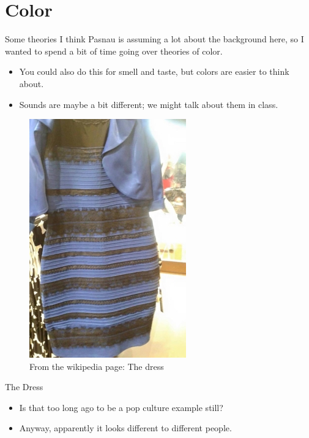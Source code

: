 \documentclass[
  17pt,
  letterpaper,
  ignorenonframetext,
  aspectratio=169,
  handout]{beamer}
\providecommand{\tightlist}{%
  \setlength{\itemsep}{0pt}\setlength{\parskip}{0pt}}\usepackage{longtable,booktabs,array}
\begin{document}
\hypertarget{color-2}{%
\section{Color}\label{color-2}}

\begin{frame}{Some theories}
\protect\hypertarget{some-theories}{}
I think Pasnau is assuming a lot about the background here, so I wanted
to spend a bit of time going over theories of color.

\begin{itemize}[<+->]
\tightlist
\item
  You could also do this for smell and taste, but colors are easier to
  think about.
\item
  Sounds are maybe a bit different; we might talk about them in class.
\end{itemize}
\end{frame}

\begin{frame}
\begin{figure}

{\centering \includegraphics{../images/the_dress.jpg}

}

\caption{From the wikipedia page: The dress}

\end{figure}
\end{frame}

\begin{frame}{The Dress}
\protect\hypertarget{the-dress}{}
\begin{itemize}[<+->]
\tightlist
\item
  Is that too long ago to be a pop culture example still?
\item
  Anyway, apparently it looks different to different people.
\end{itemize}
\end{frame}
\end{document}
